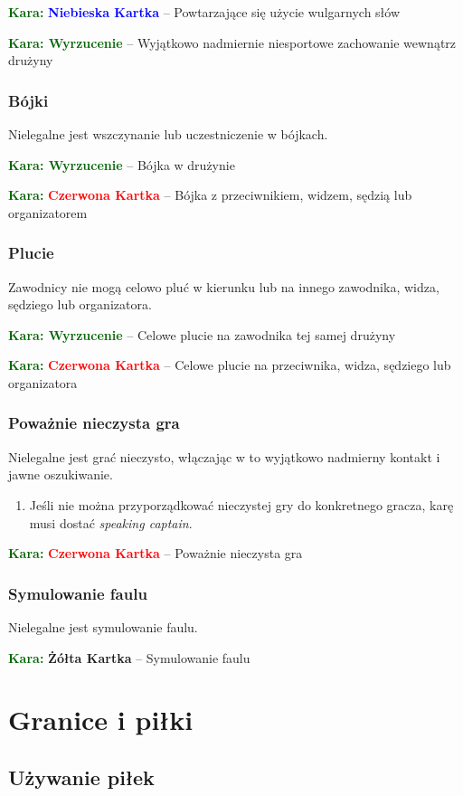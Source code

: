 \documentclass[11pt,a4paper]{article}
\newcommand\redcard[1]{\bgroup\textcolor{darkgreen}{\textbf{Kara: }}\bgroup\textcolor{red}{\textbf{Czerwona Kartka}} -- #1}
\newcommand\yellowcard[1]{\bgroup\textcolor{darkgreen}{\textbf{Kara: }}\bgroup\textcolor{darkyellow}{\textbf{Żółta Kartka}} -- #1}
\newcommand\bluecard[1]{\bgroup\textcolor{darkgreen}{\textbf{Kara: }}\bgroup\textcolor{blue}{\textbf{Niebieska Kartka}} -- #1}
\newcommand\penaltyd[2]{\bgroup\textcolor{darkgreen}{\textbf{Kara: #1}} -- #2}
\begin{document}
\bluecard{Powtarzające się użycie wulgarnych słów}

\penaltyd{Wyrzucenie}{Wyjątkowo nadmiernie niesportowe zachowanie wewnątrz drużyny}

\subsubsection{Bójki}
Nielegalne jest wszczynanie lub uczestniczenie w bójkach.

\penaltyd{Wyrzucenie}{Bójka w drużynie}

\redcard{Bójka z przeciwnikiem, widzem, sędzią lub organizatorem}

\subsubsection{Plucie}
Zawodnicy nie mogą celowo pluć w kierunku lub na innego zawodnika, widza, sędziego lub organizatora.

\penaltyd{Wyrzucenie}{Celowe plucie na zawodnika tej samej drużyny}

\redcard{Celowe plucie na przeciwnika, widza, sędziego lub organizatora}

\subsubsection{Poważnie nieczysta gra}
Nielegalne jest grać nieczysto, włączając w to wyjątkowo nadmierny kontakt i jawne oszukiwanie.
\begin{enumerate}
  \item Jeśli nie można przyporządkować nieczystej gry do konkretnego gracza, karę musi dostać \emph{speaking captain}.
\end{enumerate}

\redcard{Poważnie nieczysta gra}

\subsubsection{Symulowanie faulu}
Nielegalne jest symulowanie faulu.

\yellowcard{Symulowanie faulu}

\section{Granice i piłki}

\subsection{Używanie piłek}
\end{document}
